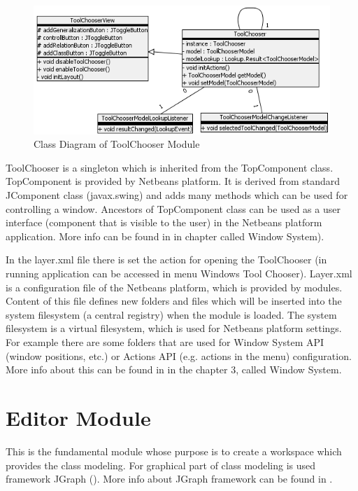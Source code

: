 \begin{figure}[!ht]
\begin{center}
\includegraphics[width=\textwidth]{img/ToolChooserModuleToolChooser.png}
\caption{Class Diagram of ToolChooser Module}
\label{f-ToolChooserModuleToolChooser}
\end{center}
\end{figure}

ToolChooser is a singleton which is inherited from the TopComponent class. TopComponent is provided by Netbeans platform. It is derived from standard JComponent class (javax.swing) and adds many methods which can be used for controlling a window. Ancestors of TopComponent class can be used as a user interface (component that is visible to the user) in the Netbeans platform application. More info can be found in \cite{netbeans6.9DevGuide} in chapter called Window System).

In the layer.xml file there is set the action for opening the ToolChooser (in running application can be accessed in menu Windows  Tool Chooser). Layer.xml is a configuration file of the Netbeans platform, which is provided by modules. Content of this file defines new folders and files which will be inserted into the system filesystem (a central registry) when the module is loaded. The system filesystem is a virtual filesystem, which is used for Netbeans platform settings. For example there are some folders that are used for Window System API (window positions, etc.) or Actions API (e.g. actions in the menu) configuration. More info about this can be found in \cite{netbeans6.9DevGuide} in the chapter 3, called Window System.

\section{Editor Module}

This is the fundamental module whose purpose is to create a workspace which provides the class modeling. For graphical part of class modeling is used framework JGraph (\cite{JGraphWeb}). More info about JGraph framework can be found in \cite{jgraphmanual}.

